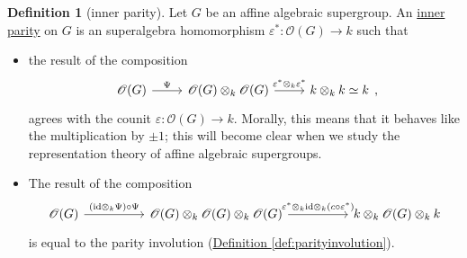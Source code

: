\documentclass[a4paper]{report}
\newcommand{\defn}[1]{\ul{#1}}
\theoremstyle{definition}
\newtheorem{definition}{Definition}[section]
\theoremstyle{plain}
\theoremstyle{remark}
\begin{document}
\begin{definition}[inner parity]
  \label{def:innerparity}
  Let $G$ be an affine algebraic supergroup. An \defn{inner parity} on $G$ is an superalgebra homomorphism $\varepsilon^{*}\colon \mathscr{O}(G) \to k$ such that
  \begin{itemize}
    \item the result of the composition
      \begin{equation*}
        \begin{tikzcd}
          \mathscr{O}(G) 
          \arrow[r, "\Psi"]
          & \mathscr{O}(G) \otimes_{k} \mathscr{O}(G)
          \arrow[r, "\varepsilon^{*} \otimes_{k} \varepsilon^{*}"]
          & k \otimes_{k} k \simeq k
        \end{tikzcd},
      \end{equation*}
      agrees with the counit $\varepsilon\colon \mathscr{O}(G) \to k$.
      Morally, this means that it behaves like the multiplication by $\pm 1$; this will become clear when we study the representation theory of affine algebraic supergroups.

    \item The result of the composition
      \begin{equation*}
        \begin{tikzcd}[column sep=huge]
          \mathscr{O}(G) 
          \arrow[r, "(\mathrm{id} \otimes_{k} \Psi) \circ \Psi"]
          & \mathscr{O}(G) \otimes_{k} \mathscr{O}(G) \otimes_{k} \mathscr{O}(G)
          \arrow[r, "\varepsilon^{*} \otimes_{k} \mathrm{id} \otimes_{k} (c \circ \varepsilon^{*})"]
          & k \otimes_{k} \mathscr{O}(G) \otimes_{k} k
        \end{tikzcd}
      \end{equation*}
      is equal to the parity involution (\hyperref[def:parityinvolution]{Definition \ref*{def:parityinvolution}}).
  \end{itemize}
\end{definition}
\end{document}
